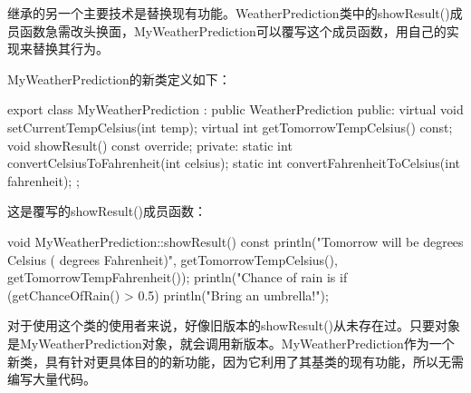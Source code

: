 
继承的另一个主要技术是替换现有功能。WeatherPrediction类中的showResult()成员函数急需改头换面，MyWeatherPrediction可以覆写这个成员函数，用自己的实现来替换其行为。

MyWeatherPrediction的新类定义如下：

\begin{cpp}
export class MyWeatherPrediction : public WeatherPrediction
{
    public:
        virtual void setCurrentTempCelsius(int temp);
        virtual int getTomorrowTempCelsius() const;
        void showResult() const override;
    private:
        static int convertCelsiusToFahrenheit(int celsius);
        static int convertFahrenheitToCelsius(int fahrenheit);
};
\end{cpp}

这是覆写的showResult()成员函数：

\begin{cpp}
void MyWeatherPrediction::showResult() const
{
    println("Tomorrow will be {} degrees Celsius ({} degrees Fahrenheit)",
        getTomorrowTempCelsius(), getTomorrowTempFahrenheit());
    println("Chance of rain is {}%
    if (getChanceOfRain() > 0.5) { println("Bring an umbrella!"); }
}
\end{cpp}

对于使用这个类的使用者来说，好像旧版本的showResult()从未存在过。只要对象是MyWeatherPrediction对象，就会调用新版本。MyWeatherPrediction作为一个新类，具有针对更具体目的的新功能，因为它利用了其基类的现有功能，所以无需编写大量代码。






